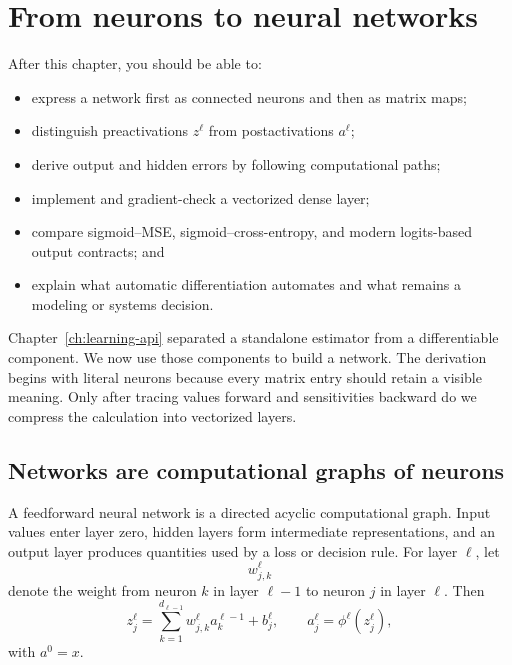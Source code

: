 \chapter{From neurons to neural networks}
\label{ch:neural-networks}

\begin{learningobjectives}
After this chapter, you should be able to:
\begin{itemize}
  \item express a network first as connected neurons and then as matrix maps;
  \item distinguish preactivations $z^\ell$ from postactivations $a^\ell$;
  \item derive output and hidden errors by following computational paths;
  \item implement and gradient-check a vectorized dense layer;
  \item compare sigmoid--MSE, sigmoid--cross-entropy, and modern logits-based
  output contracts; and
  \item explain what automatic differentiation automates and what remains a
  modeling or systems decision.
\end{itemize}
\end{learningobjectives}

\begin{chapterconnection}
Chapter~\ref{ch:learning-api} separated a standalone estimator from a
differentiable component. We now use those components to build a network. The
derivation begins with literal neurons because every matrix entry should retain
a visible meaning. Only after tracing values forward and sensitivities backward
do we compress the calculation into vectorized layers.
\end{chapterconnection}

\section{Networks are computational graphs of neurons}

A feedforward neural network is a directed acyclic computational graph. Input
values enter layer zero, hidden layers form intermediate representations, and
an output layer produces quantities used by a loss or decision rule. For layer
$\ell$, let
\[
  w_{j,k}^{\ell}
\]
denote the weight from neuron $k$ in layer $\ell-1$ to neuron $j$ in layer
$\ell$. Then
\[
  z_j^\ell
  =\sum_{k=1}^{d_{\ell-1}}w_{j,k}^\ell a_k^{\ell-1}+b_j^\ell,
  \qquad
  a_j^\ell=\phi^\ell(z_j^\ell),
\]
with $a^0=x$.

